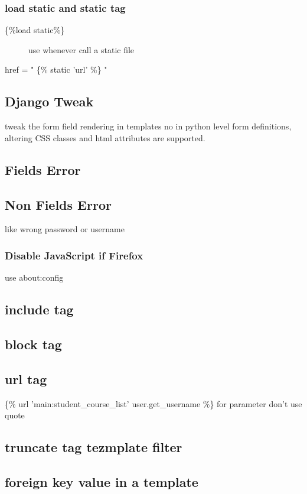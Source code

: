 \documentclass{article}
\begin{document}
			\subsubsection{load static and static tag}
				\begin{description}
					\item [\{\%load static\%\}] use whenever call a static file
					\item [href = " \{\% static 'url' \%\} " ]
				\end{description}
			
		\subsection{Django Tweak}
			tweak the form field rendering in templates no in python level form definitions, altering CSS classes and html attributes are supported.
		\subsection{Fields Error}
		\subsection{Non Fields Error}
			like wrong password or username
			\subsubsection{Disable JavaScript if Firefox}
			use about:config 
		\subsection{include tag}
		\subsection{block tag}
		\subsection{url tag}
			\{\% url 'main:student\_course\_list' user.get\_username \%\}
			for parameter don't use quote
		\subsection{truncate tag tezmplate filter}
		\subsection{foreign key value in a template}
		
\end{document}
